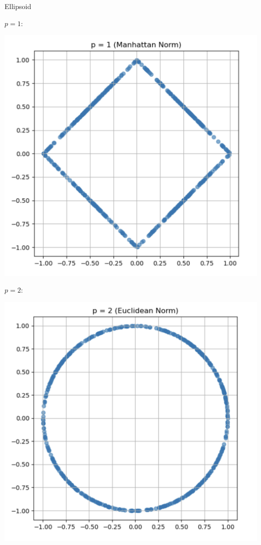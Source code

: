 \begin{ex}[Ellipsoid]{Ellipsoid}
    \begin{itemize}
        \begin{minipage}{0.33\textwidth}
            \item 
                $p = 1$: 
                \begin{center}
                    \hspace{-1.5cm}\includegraphics[scale = 0.25]{Images/Fundamental/ManhattanBall.png}
                \end{center}
        \end{minipage}
        \begin{minipage}{0.33\textwidth}
            \item 
                $p = 2$: 
                \begin{center}
                    \hspace{-1.5cm}\includegraphics[scale = 0.25]{Images/Fundamental/EuclideanBall.png}

\end{center}
\end{minipage}
\end{itemize}
\end{ex}
